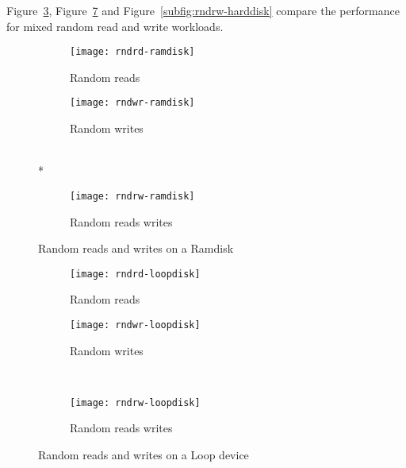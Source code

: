 Figure~\ref{subfig:rndrw-ramdisk}, Figure~\ref{subfig:rndrw-loopdisk}
and Figure~\ref{subfig:rndrw-harddisk} compare the performance for mixed
random read and write workloads.

\begin{figure}[!ht]
  \begin{subfigure}[b]{0.2\textwidth}
  \texttt{[image: rndrd-ramdisk]}
  \caption{Random reads}
  \label{subfig:rndrd-ramdisk}
  \end{subfigure}
  \hspace{50mm}
  \begin{subfigure}[b]{0.2\textwidth}
  \texttt{[image: rndwr-ramdisk]}
  \caption{Random writes}
  \label{subfig:rndwr-ramdisk}
  \end{subfigure}\\*
  \hspace{150mm}
  \begin{subfigure}[b]{0.3\textwidth}
  \texttt{[image: rndrw-ramdisk]}
  \caption{Random reads writes}
  \label{subfig:rndrw-ramdisk}
  \end{subfigure}
  \caption{Random reads and writes on a Ramdisk}\label{fig:rndramdisk}
\end{figure}

\begin{figure}[!ht]
  \begin{subfigure}[b]{0.2\textwidth}
  \texttt{[image: rndrd-loopdisk]}
  \caption{Random reads}
  \label{subfig:rndrd-loopdisk}
  \end{subfigure}
  \hspace{50mm}
  \begin{subfigure}[b]{0.2\textwidth}
  \texttt{[image: rndwr-loopdisk]}
  \caption{Random writes}
  \label{subfig:rndwr-loopdisk}
  \end{subfigure}\\
  \begin{subfigure}[b]{0.3\textwidth}
  \texttt{[image: rndrw-loopdisk]}
  \caption{Random reads writes}
  \label{subfig:rndrw-loopdisk}
  \end{subfigure}
\caption{Random reads and writes on a Loop device}\label{fig:rndloopdisk}
\end{figure}


